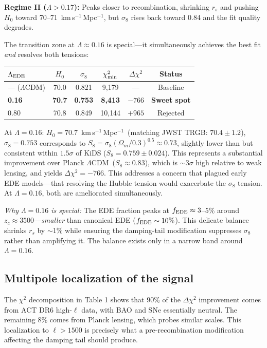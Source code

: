 \documentclass[twocolumn,showpacs,preprintnumbers,amsmath,amssymb,prd]{revtex4-2}
\newcommand{\lcdm}{$\Lambda$CDM}
\newcommand{\kms}{km\,s$^{-1}$\,Mpc$^{-1}$}
\begin{document}
\textbf{Regime II ($\Lambda > 0.17$):} Peaks closer to recombination, 
shrinking $r_s$ and pushing $H_0$ toward 70--71~\kms, but $\sigma_8$ rises 
back toward 0.84 and the fit quality degrades.

The transition zone at $\Lambda \approx 0.16$ is special---it simultaneously 
achieves the best fit \emph{and} resolves both tensions:
\begin{center}
\begin{tabular}{lccccc}
\toprule
$\Lambda_{\rm EDE}$ & $H_0$ & $\sigma_8$ & $\chi^2_{\rm min}$ & $\Delta\chi^2$ & Status \\
\midrule
--- (\lcdm) & 70.0 & 0.821 & 9{,}179 & --- & Baseline \\
\textbf{0.16} & \textbf{70.7} & \textbf{0.753} & \textbf{8{,}413} & \textbf{$-766$} & \textbf{Sweet spot} \\
0.80 & 70.8 & 0.849 & 10{,}144 & $+965$ & Rejected \\
\bottomrule
\end{tabular}
\end{center}

At $\Lambda = 0.16$: $H_0 = 70.7$~\kms\ (matching JWST TRGB: $70.4 \pm 1.2$), 
$\sigma_8 = 0.753$ corresponds to $S_8 = \sigma_8(\Omega_m/0.3)^{0.5} \approx 0.73$, 
slightly lower than but consistent within $1.5\sigma$ of KiDS ($S_8 = 0.759 \pm 0.024$). 
This represents a substantial improvement over Planck \lcdm\ ($S_8 \approx 0.83$), 
which is $\sim 3\sigma$ high relative to weak lensing, and yields $\Delta\chi^2 = -766$.
This addresses a concern that plagued early EDE models---that resolving the 
Hubble tension would exacerbate the $\sigma_8$ tension. At $\Lambda = 0.16$, 
both are ameliorated simultaneously.

\emph{Why $\Lambda = 0.16$ is special:} The EDE fraction peaks at 
$f_{\rm EDE} \approx 3$--$5\%$ around $z_c \approx 3500$---\emph{smaller} 
than canonical EDE ($f_{\rm EDE} \sim 10\%$). This delicate balance shrinks 
$r_s$ by $\sim$1\% while ensuring the damping-tail modification suppresses 
$\sigma_8$ rather than amplifying it. The balance exists only in a narrow 
band around $\Lambda = 0.16$.

\subsection{Multipole localization of the signal}

The $\chi^2$ decomposition in Table 1 shows that 90\% of the $\Delta\chi^2$ 
improvement comes from ACT DR6 high-$\ell$ data, with BAO and SNe essentially 
neutral. The remaining 8\% comes from Planck lensing, which probes similar 
scales. This localization to $\ell > 1500$ is precisely what a pre-recombination 
modification affecting the damping tail should produce.
\end{document}
